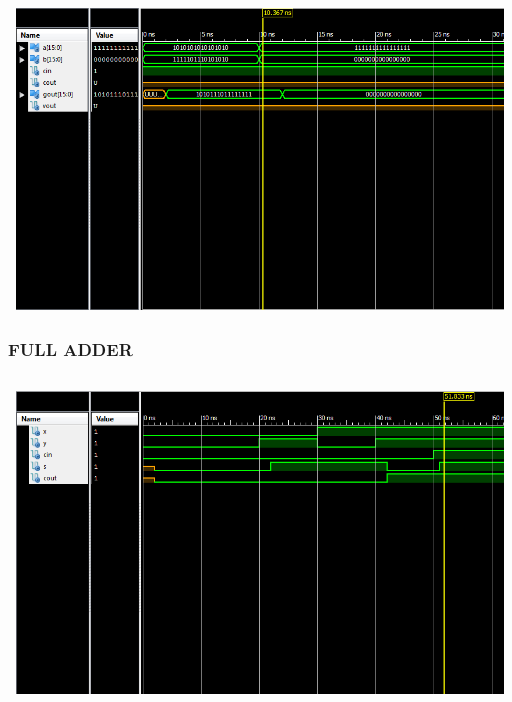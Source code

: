 \documentclass{article}
\begin{document}
\begin{lstlisting}

\end{lstlisting}
\includegraphics[width=16cm, height=8cm]{test_ripple.png}
\pagebreak


\subsubsection{FULL ADDER}\label{sec:result}

\begin{lstlisting}

\end{lstlisting}
\includegraphics[width=16cm, height=8cm]{test_full.png}
\pagebreak
	
\end{document}
